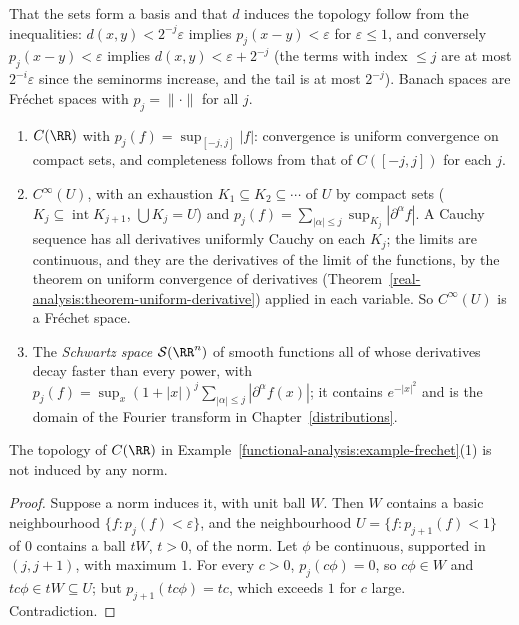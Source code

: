 That the sets form a basis and that $d$ induces the topology follow from the inequalities: $d(x, y) < 2^{-j}\varepsilon$ implies $p_j(x - y) < \varepsilon$ for $\varepsilon \leq 1$, and conversely
$p_j(x - y) < \varepsilon$ implies $d(x, y) < \varepsilon + 2^{-j}$ (the terms with index $\leq j$ are at most $2^{-i}\varepsilon$ since the seminorms increase, and the tail is at most $2^{-j}$).
Banach spaces are Fr\'echet spaces with $p_j = \|\cdot\|$ for all $j$.

\begin{example}\label{functional-analysis:example-frechet}
\begin{enumerate}
\item $C(\RR)$ with $p_j(f) = \sup_{[-j, j]}|f|$: convergence is uniform convergence on compact sets, and completeness follows from that of $C([-j, j])$ for each $j$.
\item $C^\infty(U)$, with an exhaustion $K_1 \subseteq K_2 \subseteq \cdots$ of $U$ by compact sets ($K_j \subseteq \operatorname{int}K_{j+1}$, $\bigcup K_j = U$) and
$p_j(f) = \sum_{|\alpha| \leq j}\sup_{K_j}|\partial^\alpha f|$. A Cauchy sequence has all derivatives uniformly Cauchy on each $K_j$; the limits are continuous, and they are the derivatives of the limit
of the functions, by the theorem on uniform convergence of derivatives (Theorem~\ref{real-analysis:theorem-uniform-derivative}) applied in each variable. So $C^\infty(U)$ is a Fr\'echet space.
\item The \emph{Schwartz space} $\mathcal{S}(\RR^n)$ of smooth functions all of whose derivatives decay faster than every power, with $p_j(f) = \sup_x(1 + |x|)^j\sum_{|\alpha| \leq j}|\partial^\alpha f(x)|$; it
contains $e^{-|x|^2}$ and is the domain of the Fourier transform in Chapter~\ref{distributions}.
\end{enumerate}
\end{example}

\begin{proposition}\label{functional-analysis:proposition-not-normable}
The topology of $C(\RR)$ in Example~\ref{functional-analysis:example-frechet}(1) is not induced by any norm.
\end{proposition}

\begin{proof}
Suppose a norm induces it, with unit ball $W$. Then $W$ contains a basic neighbourhood $\{f : p_j(f) < \varepsilon\}$, and the neighbourhood $U = \{f : p_{j+1}(f) < 1\}$ of $0$ contains a ball $tW$,
$t > 0$, of the norm. Let $\phi$ be continuous, supported in $(j, j + 1)$, with maximum $1$. For every $c > 0$, $p_j(c\phi) = 0$, so $c\phi \in W$ and $tc\phi \in tW \subseteq U$; but
$p_{j+1}(tc\phi) = tc$, which exceeds $1$ for $c$ large. Contradiction.
\end{proof}

